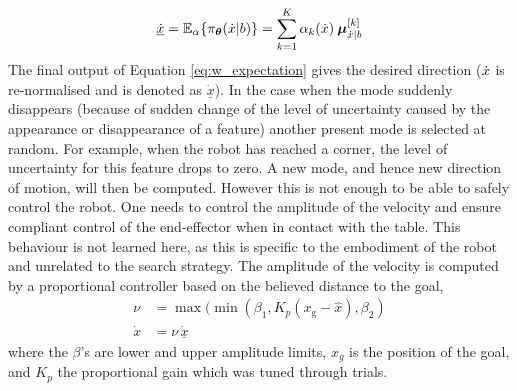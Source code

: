 \begin{equation}\label{eq:w_expectation}
 \underline{\dot{x}} = \mathbb{E}_{\alpha}\{\pi_{\boldsymbol{\theta}}(\dot{x}|b)\} = \sum\limits_{k=1}^{K} \alpha_{k}(\dot{x}) \:\boldsymbol{\mu}^{[k]}_{\dot{x}|b}
\end{equation}
% 
%
The final output of Equation \ref{eq:w_expectation} gives the desired direction
($\dot{x}$ is re-normalised and is denoted as $\underline{\dot{x}}$). In the case when the mode suddenly disappears
(because of sudden change of the level of uncertainty caused by the appearance or disappearance of a feature)
another present mode is selected at random. For example, when the robot has reached a corner, the level of uncertainty for this feature drops to zero.
A new mode, and hence new direction of motion, will then  be computed.
However this is not enough to be able to safely control the robot.
One needs to control the amplitude of the velocity and ensure compliant control 
of the end-effector when in contact with the table. This behaviour is not learned here, as this is specific to 
the embodiment of the robot and unrelated to the search strategy. The 
amplitude of the velocity is computed by a proportional controller based on the
believed distance to the goal,
\begin{align} \label{eq:ch3:amplitude}
     \nu &= \max(\min(\beta_{1},K_{p}(x_{\mathrm{g}} - \hat{x}),\beta_{2}) \\ \nonumber
 \dot{x} &=  \nu\,\underline{\dot{x}}
\end{align}
where the $\beta$'s are lower and upper amplitude limits, $x_{g}$ is the
position of the goal, and $K_{p}$ the proportional gain which was tuned through
trials.

%
%

